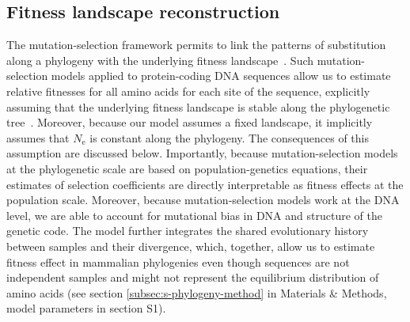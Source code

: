 \documentclass{article}
\newcommand{\Ne}{N_{\text{e}}}
\begin{document}
    \subsection*{Fitness landscape reconstruction}

    The mutation-selection framework permits to link the patterns of substitution along a phylogeny with the underlying fitness landscape~\cite{halpern_evolutionary_1998, mccandlish_modeling_2014}.
    Such mutation-selection models applied to protein-coding DNA sequences allow us to estimate relative fitnesses for all amino acids for each site of the sequence, explicitly assuming that the underlying fitness landscape is stable along the phylogenetic tree~\cite{rodrigue_mechanistic_2010, tamuri_estimating_2012, rodrigue_detecting_2017}.
    Moreover, because our model assumes a fixed landscape, it implicitly assumes that $\Ne$ is constant along the phylogeny.
    The consequences of this assumption are discussed below.
    Importantly, because mutation-selection models at the phylogenetic scale are based on population-genetics equations, their estimates of selection coefficients are directly interpretable as fitness effects at the population scale.
    Moreover, because mutation-selection models work at the DNA level, we are able to account for mutational bias in DNA and structure of the genetic code.
    The model further integrates the shared evolutionary history between samples and their divergence, which, together, allow us to estimate fitness effect in mammalian phylogenies even though sequences are not independent samples and might not represent the equilibrium distribution of amino acids (see section \ref{subsec:s-phylogeny-method} in Materials \& Methods, model parameters in section S1).
\end{document}
